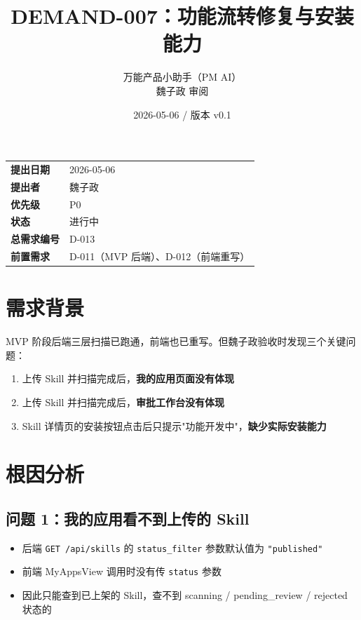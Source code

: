 \documentclass[11pt,a4paper]{article}
\title{\textbf{DEMAND-007：功能流转修复与安装能力}}
\author{万能产品小助手（PM AI）\\魏子政 审阅}
\date{2026-05-06 / 版本 v0.1}
\begin{document}
\maketitle

\begin{center}
\begin{tabular}{>{\bfseries}p{3cm} p{10cm}}
\toprule
提出日期 & 2026-05-06 \\
提出者 & 魏子政 \\
优先级 & \textcolor{danger}{P0} \\
状态 & \textcolor{progress}{进行中} \\
总需求编号 & D-013 \\
前置需求 & D-011（MVP 后端）、D-012（前端重写） \\
\bottomrule
\end{tabular}
\end{center}

\vspace{1em}

\section{需求背景}

MVP 阶段后端三层扫描已跑通，前端也已重写。但魏子政验收时发现三个关键问题：

\begin{enumerate}[nosep]
  \item 上传 Skill 并扫描完成后，\textbf{我的应用页面没有体现}
  \item 上传 Skill 并扫描完成后，\textbf{审批工作台没有体现}
  \item Skill 详情页的安装按钮点击后只提示"功能开发中"，\textbf{缺少实际安装能力}
\end{enumerate}

\section{根因分析}

\subsection{问题 1：我的应用看不到上传的 Skill}

\begin{itemize}[nosep]
  \item 后端 \texttt{GET /api/skills} 的 \texttt{status\_filter} 参数默认值为 \texttt{"published"}
  \item 前端 MyAppsView 调用时没有传 \texttt{status} 参数
  \item 因此只能查到已上架的 Skill，查不到 scanning / pending\_review / rejected 状态的
\end{itemize}
\end{document}
